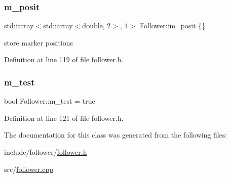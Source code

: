 \subsubsection{\texorpdfstring{m\+\_\+posit}{m\_posit}}
{\footnotesize\ttfamily std\+::array$<$std\+::array$<$double, 2$>$, 4$>$ Follower\+::m\+\_\+posit \{\}}



store marker positions 



Definition at line 119 of file follower.\+h.

\mbox{\label{class_follower_a64e365d54197c51a8d1f777900b09647}} 
\subsubsection{\texorpdfstring{m\+\_\+test}{m\_test}}
{\footnotesize\ttfamily bool Follower\+::m\+\_\+test = true}



Definition at line 121 of file follower.\+h.



The documentation for this class was generated from the following files\+:\begin{DoxyCompactItemize}
\item 
include/follower/\hyperlink{follower_8h}{follower.\+h}\item 
src/\hyperlink{follower_8cpp}{follower.\+cpp}\end{DoxyCompactItemize}
